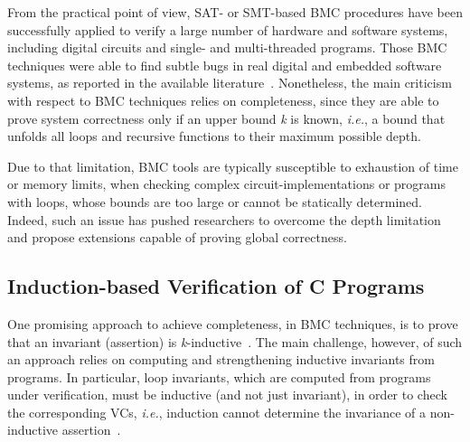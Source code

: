 \documentclass[format=acmsmall, review=false, screen=true]{acmart}
\begin{document}
From the practical point of view, SAT- or SMT-based BMC procedures have been successfully applied to verify a large number of hardware and software systems, including digital circuits and single- and multi-threaded programs. Those BMC techniques were able to find subtle bugs in real digital and embedded software systems, as reported in the available literature~\cite{Clarke04,MerzFS12,CordeiroF11,Ivancic05,Cordeiro12}. Nonetheless, the main criticism with respect to BMC techniques relies on completeness, since they are able to prove system correctness only if an upper bound \textit{k} is known, {\it i.e.}, a bound that unfolds all loops and recursive functions to their maximum possible depth. 

Due to that limitation, BMC tools are typically susceptible to exhaustion of time or memory limits, when checking complex circuit-implementations or programs with loops, whose bounds are too large or cannot be statically determined. Indeed, such an issue has pushed researchers to overcome the depth limitation and propose extensions capable of proving global correctness.

\subsection{Induction-based Verification of C Programs}

One promising approach to achieve completeness, in BMC techniques, is to prove that an invariant (assertion) is \textit{k}-inductive~\cite{EenS03,Sheera00}. The main challenge, however, of such an approach relies on computing and strengthening inductive invariants from programs. In particular, loop invariants, which are computed from programs under verification, must be inductive (and not just invariant), in order to check the corresponding VCs, {\it i.e.}, induction cannot determine the invariance of a non-inductive assertion~\cite{Bradley07}. 
\end{document}
